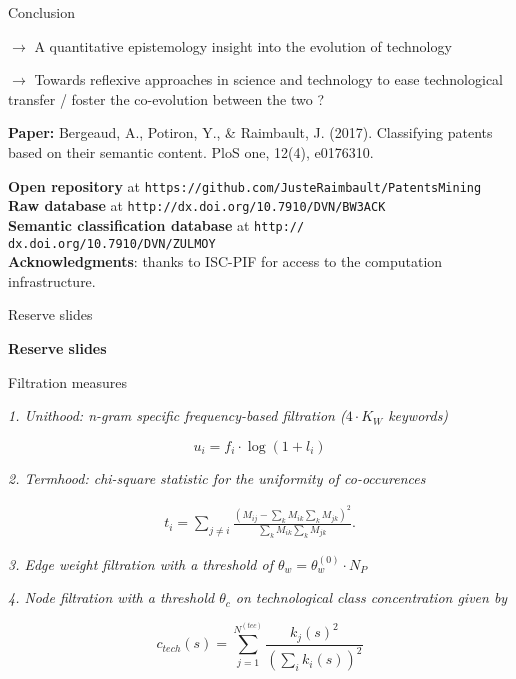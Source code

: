 \documentclass{beamer}
\begin{document}
\begin{frame}{Conclusion}

$\rightarrow$ A quantitative epistemology insight into the evolution of technology

\medskip

$\rightarrow$ Towards reflexive approaches in science and technology to ease technological transfer / foster the co-evolution between the two ?


\bigskip
\bigskip

\textbf{Paper: } Bergeaud, A., Potiron, Y., & Raimbault, J. (2017). Classifying patents based on their semantic content. PloS one, 12(4), e0176310.

\medskip

\textbf{Open repository} at \texttt{https://github.com/JusteRaimbault/PatentsMining}\\\medskip
\textbf{Raw database} at \texttt{http://dx.doi.org/10.7910/DVN/BW3ACK}\\\medskip 
\textbf{Semantic classification database} at  \texttt{http:// dx.doi.org/10.7910/DVN/ZULMOY}\\\medskip
\textbf{Acknowledgments}: thanks to ISC-PIF for access to the computation infrastructure.

\end{frame}


\begin{frame}{Reserve slides}
    
    \centering
    \Huge
    \textbf{Reserve slides}
    
\end{frame}

\begin{frame}{Filtration measures}

\label{slide:filtration}
\hyperlink{slide:relevance}{}



    
    \textit{1. Unithood: n-gram specific frequency-based filtration ($4\cdot K_W$ keywords)}
    
	\[
	u_i = f_i\cdot \log{(1 + l_i)}
	\]
    
    \medskip
    
    \textit{2. Termhood: chi-square statistic for the uniformity of co-occurences}
    
    \medskip
    
    \begin{eqnarray}
\label{termhood}
t_i = \sum_{j\neq i}\frac{\left( M_{ij} - \sum_{k}M_{ik} \sum_{k} M_{jk}\right)^2}{\sum_{k}M_{ik} \sum_{k} M_{jk}}.
\end{eqnarray}

    \medskip

	\textit{3. Edge weight filtration with a threshold of $\theta_w = \theta_w^{(0)}\cdot N_P$}
	
	\medskip

	\textit{4. Node filtration with a threshold $\theta_c$ on technological class concentration given by}
    
    \[
    c_{tech}(s) = \displaystyle \sum_{j=1}^{N^{(tec)}} \frac{k_j(s)^2}{ \left(\sum_i k_i(s)\right)^2}
    \]
    
    
\end{frame}
\end{document}
